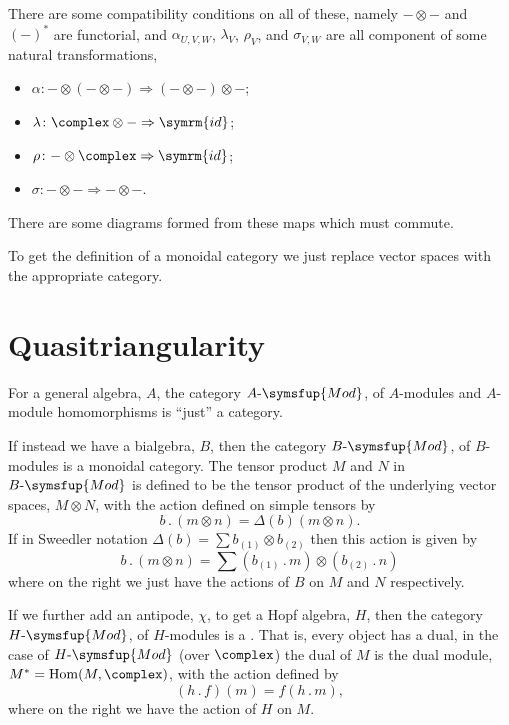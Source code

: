 \documentclass[fleqn]{NotesClass}
\makeatletter
\newcommand{\id}{\symrm{id}}
\DeclareMathOperator{\Hom}{Hom}
\newcommand{\action}{\mathbin{.}}
\newcommand{\c@egory}[1]{\symsfup{#1}}
\newcommand{\AMod}[1][A]{#1\text{-}\c@egory{Mod}}
\makeatother
\begin{document}
    There are some compatibility conditions on all of these, namely \({-}\otimes{-}\) and \((-)^*\) are functorial, and \(\alpha_{U,V,W}\), \(\lambda_V\), \(\rho_V\), and \(\sigma_{V,W}\) are all component of some natural transformations,
    \begin{itemize}
        \item \(\alpha \colon {-} \otimes ({-} \otimes {-}) \Rightarrow ({-} \otimes {-}) \otimes {-}\);
        \item \(\lambda \colon \complex \otimes {-} \Rightarrow \id\);
        \item \(\rho \colon {-} \otimes \complex \Rightarrow \id\);
        \item \(\sigma \colon {-}\otimes{-} \Rightarrow {-}\otimes{-}\).
    \end{itemize}
    There are some diagrams formed from these maps which must commute.
    
    To get the definition of a monoidal category we just replace vector spaces with the appropriate category.
    
    \section{Quasitriangularity}
    For a general algebra, \(A\), the category \(\AMod\), of \(A\)-modules and \(A\)-module homomorphisms is \enquote{just} a category.
    
    If instead we have a bialgebra, \(B\), then the category \(\AMod[B]\), of \(B\)-modules is a monoidal category.
    The tensor product \(M\) and \(N\) in \(\AMod[B]\) is defined to be the tensor product of the underlying vector spaces, \(M \otimes N\), with the action defined on simple tensors by
    \begin{equation}
        b \action (m \otimes n) = \Delta(b)(m \otimes n).
    \end{equation}
    If in Sweedler notation \(\Delta(b) = \sum b_{(1)} \otimes b_{(2)}\) then this action is given by
    \begin{equation}
        b \action (m \otimes n) = \sum (b_{(1)} \action m) \otimes (b_{(2)} \action n)
    \end{equation}
    where on the right we just have the actions of \(B\) on \(M\) and \(N\) respectively.
    
    If we further add an antipode, \(\chi\), to get a Hopf algebra, \(H\), then the category \(\AMod[H]\), of \(H\)-modules is a .
    That is, every object has a dual, in the case of \(\AMod[H]\) (over \(\complex\)) the dual of \(M\) is the dual module, \(M^* = \Hom(M, \complex)\), with the action defined by
    \begin{equation}
        (h \action f)(m) = f(h \action m),
    \end{equation}
    where on the right we have the action of \(H\) on \(M\).
    
\end{document}
